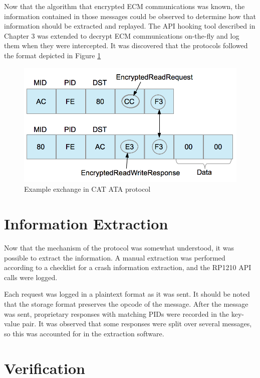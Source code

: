 Now that the algorithm that encrypted ECM communications was known, the information contained in those
messages could be observed to determine how that information should be extracted and replayed. The
API hooking tool described in Chapter 3 was extended to decrypt ECM communications on-the-fly
and log them when they were intercepted. It was discovered that the protocols followed the format depicted
in Figure \ref{fig:ataprotocol}

\begin{figure}[h]
  \centering
  \includegraphics{cat-protocol-diagram}
  \caption{Example exchange in CAT ATA protocol}
  \label{fig:ataprotocol}
\end{figure}

\section{Information Extraction}

Now that the mechanism of the protocol was somewhat understood, it was possible to extract the information.
A manual extraction was performed according to a checklist for a crash information extraction, and the 
RP1210 API calls were logged.

Each request was logged in a plaintext format as it was sent. 
It should be noted that the storage format preserves the opcode of the message. After the message was sent, proprietary
responses with matching PIDs were recorded in the key-value pair. It was observed that some responses were split over
several messages, so this was accounted for in the extraction software.

\section{Verification}

